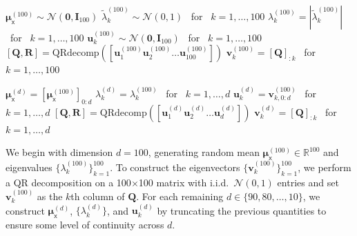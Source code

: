 \documentclass{article}
\theoremstyle{plain}
\theoremstyle{definition}
\theoremstyle{remark}
\renewcommand{\tilde}{\widetilde}
\renewcommand{\vec}[1]{\ensuremath{\boldsymbol{#1}}}
\newcommand{\mc}[1]{\ensuremath{\mathcal{#1}}}
\newcommand{\Real}{{\mathbb{R}}}
\newcommand{\muxd}[1]{\vec{\mu}_{\mathsf{x}}^{(#1)}}
\newcommand{\evald}[2]{\lambda_{#1}^{(#2)}}
\newcommand{\evaltd}[2]{\tilde{\lambda}_{#1}^{(#2)}}
\newcommand{\evecud}[2]{\vec{u}_{#1}^{(#2)}}
\newcommand{\evecd}[2]{\vec{v}_{#1}^{(#2)}}
\begin{document}
\begin{algorithm}[h]
\caption{Gaussian prior generation}\label{alg:priors}
\begin{algorithmic}[1]

\State $\muxd{100} \sim \mc{N}(\vec{0}, \vec{I}_{100})$
\State $\evaltd{k}{100} \sim \mc{N}(0, 1)$ ~for~ $k=1,\dots,100$
\State $\evald{k}{100} = |\evaltd{k}{100}|$ ~for~ $k=1,\dots,100$
\State $\evecud{k}{100} \sim \mc{N}(\vec{0}, \vec{I}_{100})$ ~for~ $k=1,\dots,100$
\State $[\vec{Q},\vec{R}] = \text{QRdecomp}([\evecud{1}{100} \evecud{2}{100} \dots \evecud{100}{100}])$
\State $\evecd{k}{100} = [\vec{Q}]_{:k}$ ~for~ $k=1,\dots,100$

\State
{}
\State $\muxd{d} = [\muxd{100}]_{0:d}$
\State $\evald{k}{d} = \evald{k}{100}$ ~for~ $k=1,\dots,d$
\State $\evecud{k}{d} = \evecd{k,0:d}{100}$ ~for~ $k=1,\dots,d$
\State $[\vec{Q},\vec{R}] = \text{QRdecomp}([\evecud{1}{d} \evecud{2}{d} \dots \evecud{d}{d}])$
\State $\evecd{k}{d} = [\vec{Q}]_{:k}$ ~for~ $k=1,\dots,d$
\EndFor

\end{algorithmic}
\end{algorithm}
We begin with dimension $d=100$, generating random mean $\muxd{100}\in\Real^{100}$ and eigenvalues $\{\evald{k}{100}\}_{k=1}^{100}$.
To construct the eigenvectors $\{\evecd{k}{100}\}_{k=1}^{100}$, we perform a QR decomposition on a 100$\times$100 matrix with i.i.d.\ $\mc{N}(0,1)$ entries and set $\evecd{k}{100}$ as the $k$th column of $\vec{Q}$.
For each remaining $d\in\{90,80,\dots,10\}$, we construct $\muxd{d}$, $\{\evald{k}{d}\}$, and $\evecud{k}{d}$ by truncating the previous quantities to ensure some level of continuity across $d$.

\end{document}
